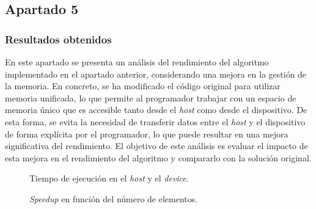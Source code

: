 \documentclass{article}
\begin{document}
	\subsection{Apartado 5}

		\subsubsection{Resultados obtenidos}

			En este apartado se presenta un análisis del rendimiento del algoritmo implementado en el apartado anterior, considerando una mejora en la gestión de la memoria. En concreto, se ha modificado el código original para utilizar memoria unificada, lo que permite al programador trabajar con un espacio de memoria único que es accesible tanto desde el \textit{host} como desde el dispositivo. De esta forma, se evita la necesidad de transferir datos entre el \textit{host} y el dispositivo de forma explícita por el programador, lo que puede resultar en una mejora significativa del rendimiento. El objetivo de este análisis es evaluar el impacto de esta mejora en el rendimiento del algoritmo y compararlo con la solución original.

			\begin{figure}
				\centering
				\caption{Tiempo de ejecución en el \textit{host} y el \textit{device}.}
				\label{fig:time_vs_elements_5}
			\end{figure}

			\begin{figure}
				\centering
				\caption{\textit{Speedup} en función del número de elementos.}
				\label{fig:time_vs_elements_host_5}
			\end{figure}
\end{document}
